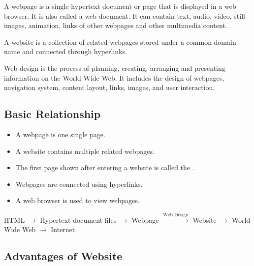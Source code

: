\begin{definitionbox}[Webpage]
    A webpage is a single hypertext document or page that is displayed in a web browser. It is also called a web document. It can contain text, audio, video, still images, animation, links of other webpages and other multimedia content.
\end{definitionbox}

\begin{definitionbox}[Website]
    A website is a collection of related webpages stored under a common domain name and connected through hyperlinks.
\end{definitionbox}

\begin{definitionbox}
    Web design is the process of planning, creating, arranging and presenting information on the World Wide Web. It includes the design of webpages, navigation system, content layout, links, images, and user interaction.
\end{definitionbox}

\subsection{Basic Relationship}

\begin{itemize}
    \item A webpage is one single page.
    \item A website contains multiple related webpages.
    \item The first page shown after entering a website is called the .
    \item Webpages are connected using hyperlinks.
    \item A web browser is used to view webpages.
\end{itemize}

\begin{summarybox}
    HTML $\rightarrow$ Hypertext document files $\rightarrow$ Webpage $\xrightarrow{\text{Web Design}}$ Website $\rightarrow$ World Wide Web $\rightarrow$ Internet
\end{summarybox}


\subsection{Advantages of Website}

